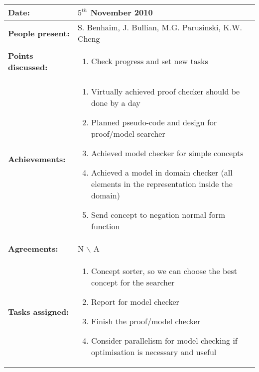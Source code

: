 \documentclass[12pt,a4paper]{article}
\newcommand{\meeting}[6]{%
\begin{center}%
\begin{longtable}{| p{3.5cm} | | p{13cm} |}%
\hline%
\textbf{Date:} & #1 \\%
\hline%
\textbf{People present:} &#2 \\%
\hline%
\textbf{Points discussed:} &#3\\%
\hline%
\textbf{Achievements:} &#4 \\%
\hline%
\textbf{Agreements:} &#5 \\%
\hline%
\textbf{Tasks assigned:} &#6  \\%
\hline%
\end{longtable}%
\end{center}%
\bigbreak
}
\begin{document}
\meeting{$5^{th}$ November 2010}%
{S. Benhaim, J. Bullian, M.G. Parusinski, K.W. Cheng}%
{\begin{enumerate} 
\item  Check progress and set new tasks
\end{enumerate} }%
{\begin{enumerate}
\item Virtually achieved proof checker should be done by a day
\item Planned pseudo-code and design for proof/model searcher
\item Achieved model checker for simple concepts
\item Achieved a model in domain checker (all elements in the representation inside the domain)
\item Send concept to negation normal form function
\end{enumerate}}%
{N $\backslash$ A}
{\begin{enumerate}
\item Concept sorter, so we can choose the best concept for the searcher
\item Report for model checker
\item Finish the proof/model checker
\item Consider parallelism for model checking if optimisation is necessary and useful
\end{enumerate}}%
\end{document}
